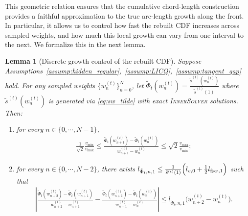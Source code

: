 \documentclass{article}
\newtheorem{lemma}{Lemma}
\newcommand{\fPF}{{\mathbf{f}_{\rm PF}}}
\newcommand{\Farc}{\Phi}
\begin{document}
This geometric relation ensures that the cumulative chord-length construction provides a faithful approximation to the true arc-length growth along the front. In particular, it allows us to control how fast the rebuilt CDF increases across sampled weights, and how much this local growth can vary from one interval to the next. We formalize this in the next lemma.

\begin{lemma}[Discrete growth control of the rebuilt CDF]
\label{lem:discrete_growth_control_tildeF_biobj}
Suppose Assumptions~\ref{assump:hidden_regular},~\ref{assump:LICQ},~\ref{assump:tangent_gap} hold. 
For any sampled weights $\{w_n^{(t)}\}_{n=0}^N$, let $\tilde \Farc_t(w_n^{(t)})=\frac{\tilde s^{(t)}(w_n^{(t)})}{\tilde s^{(t)}(1)}$ where $\tilde s^{(t)}(w_n^{(t)})$ is generated via \eqref{eq:sw_tilde} with exact \textsc{InnerSolver} solutions. Then:

\begin{enumerate}[label=(\roman*), leftmargin=*, align=left]
 \item for every $n\in\{0,\cdots,N-1\}$,
 \begin{align}
 \frac{1}{\sqrt2}\frac{v_{\min}}{v_{\max}}
 \le
 \frac{\tilde \Farc_t(w_{n+1}^{(t)})-\tilde \Farc_t(w_n^{(t)})}{w_{n+1}^{(t)}-w_n^{(t)}}
 \le
 \sqrt2 \frac{v_{\max}}{v_{\min}};
 \label{eq:tildeF_secant_bounds_biobj_merged}
 \end{align}

 \item for every $n\in\{0,\cdots,N-2\}$, there exists $l_{\tilde \Farc_t,n,1}
 \le
 \frac{1}{\tilde s^{(t)}(1)}
 \Bigl(l_{v,0}+\frac12 l_{\fPF,1}\Bigr)$
 such that
 \begin{align}
 \left|
 \frac{\tilde \Farc_t(w_{n+2}^{(t)})-\tilde \Farc_t(w_{n+1}^{(t)})}{w_{n+2}^{(t)}-w_{n+1}^{(t)}}
 -
 \frac{\tilde \Farc_t(w_{n+1}^{(t)})-\tilde \Farc_t(w_n^{(t)})}{w_{n+1}^{(t)}-w_n^{(t)}}
 \right|
 \le
 l_{\tilde \Farc_t,n,1}\bigl(w_{n+2}^{(t)}-w_n^{(t)}\bigr).
 \label{eq:tildeF_secant_variation_biobj_merged}
 \end{align}
\end{enumerate}
\end{lemma}
\end{document}
